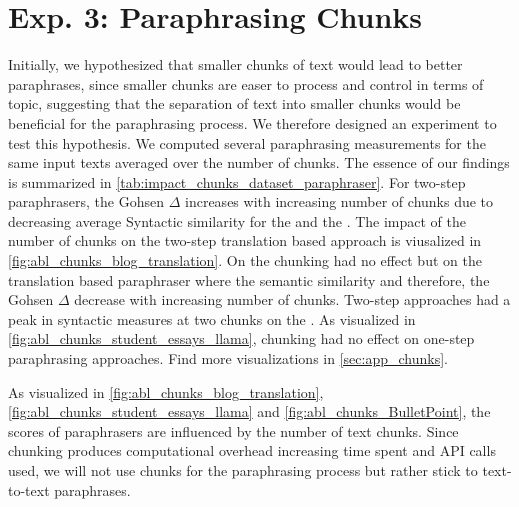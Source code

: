 \section{Exp. 3: Paraphrasing Chunks}

Initially, we hypothesized that smaller chunks of text would lead to better paraphrases, since smaller chunks are easer to process and control in terms of topic, suggesting that the separation of text into smaller chunks would be beneficial for the paraphrasing process.
We therefore designed an experiment to test this hypothesis.
We computed several paraphrasing measurements for the same input texts averaged over the number of chunks.
The essence of our findings is summarized in \autoref{tab:impact_chunks_dataset_paraphraser}.
For two-step paraphrasers, the Gohsen $\Delta$ increases with increasing number of chunks due to decreasing average Syntactic similarity for the \dataBlog{} and the \dataStudent{}.
The impact of the number of chunks on the two-step translation based approach is viusalized in \autoref{fig:abl_chunks_blog_translation}.
On the \dataGutenberg{} chunking had no effect but on the translation based paraphraser where the semantic similarity and therefore, the Gohsen $\Delta$ decrease with increasing number of chunks.
Two-step approaches had a peak in syntactic measures at two chunks on the \dataPan{}.
As visualized in \autoref{fig:abl_chunks_student_essays_llama}, chunking had no effect on one-step paraphrasing approaches.
Find more visualizations in \autoref{sec:app_chunks}.

As visualized in \autoref{fig:abl_chunks_blog_translation}, \autoref{fig:abl_chunks_student_essays_llama} and \autoref{fig:abl_chunks_BulletPoint},
the scores of paraphrasers are influenced by the number of text chunks.
Since chunking produces computational overhead increasing time spent and API calls used, we will not use chunks for the paraphrasing process but rather stick to text-to-text paraphrases.

